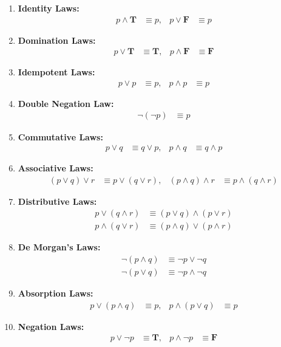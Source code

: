\documentclass[11pt,a4paper]{article}
\begin{document}
\begin{enumerate}[label=\textbf{\arabic*.}, leftmargin=*]
    \item \textbf{Identity Laws:} 
    \begin{align*}
        p \land \mathbf{T} &\equiv p, & p \lor \mathbf{F} &\equiv p
    \end{align*}
    \item \textbf{Domination Laws:}
    \begin{align*}
        p \lor \mathbf{T} &\equiv \mathbf{T}, & p \land \mathbf{F} &\equiv \mathbf{F}
    \end{align*}
    \item \textbf{Idempotent Laws:}
    \begin{align*}
        p \lor p &\equiv p, & p \land p &\equiv p
    \end{align*}
    \item \textbf{Double Negation Law:}
    \begin{align*}
        \neg(\neg p) &\equiv p
    \end{align*}
    \item \textbf{Commutative Laws:}
    \begin{align*}
        p \lor q &\equiv q \lor p, & p \land q &\equiv q \land p
    \end{align*}
    \item \textbf{Associative Laws:}
    \begin{align*}
        (p \lor q) \lor r &\equiv p \lor (q \lor r), & (p \land q) \land r &\equiv p \land (q \land r)
    \end{align*}
    \item \textbf{Distributive Laws:}
    \begin{align*}
        p \lor (q \land r) &\equiv (p \lor q) \land (p \lor r) \\
        p \land (q \lor r) &\equiv (p \land q) \lor (p \land r)
    \end{align*}
    \item \textbf{De Morgan's Laws:}
    \begin{align*}
        \neg(p \land q) &\equiv \neg p \lor \neg q \\
        \neg(p \lor q) &\equiv \neg p \land \neg q
    \end{align*}
    \item \textbf{Absorption Laws:}
    \begin{align*}
        p \lor (p \land q) &\equiv p, & p \land (p \lor q) &\equiv p
    \end{align*}
    \item \textbf{Negation Laws:}
    \begin{align*}
        p \lor \neg p &\equiv \mathbf{T}, & p \land \neg p &\equiv \mathbf{F}
    \end{align*}
\end{enumerate}
\end{document}
